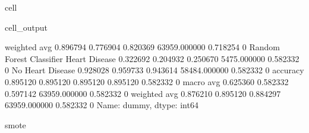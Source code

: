 \documentclass[letterpaper,10pt,english]{jupyterBook}
\begin{document}
\begin{sphinxuseclass}{cell}
\begin{sphinxVerbatimOutput}
\begin{sphinxuseclass}{cell_output}
\begin{sphinxVerbatim}[commandchars=\\\{\}]
                           weighted avg      0.896794   0.776904  0.820369  63959.000000  0.718254    0
Random Forest Classifier   Heart Disease     0.322692   0.204932  0.250670  5475.000000   0.582332    0
                           No Heart Disease  0.928028   0.959733  0.943614  58484.000000  0.582332    0
                           accuracy          0.895120   0.895120  0.895120  0.895120      0.582332    0
                           macro avg         0.625360   0.582332  0.597142  63959.000000  0.582332    0
                           weighted avg      0.876210   0.895120  0.884297  63959.000000  0.582332    0
Name: dummy, dtype: int64

smote
\PYGZhy{}\PYGZhy{}\PYGZhy{}\PYGZhy{}\PYGZhy{}\PYGZhy{}\PYGZhy{}\PYGZhy{}\PYGZhy{}\PYGZhy{}\PYGZhy{}\PYGZhy{}\PYGZhy{}\PYGZhy{}\PYGZhy{}\PYGZhy{}\PYGZhy{}\PYGZhy{}\PYGZhy{}
\end{sphinxVerbatim}

\noindent{}


\end{sphinxuseclass}
\end{sphinxVerbatimOutput}
\end{sphinxuseclass}
\end{document}
